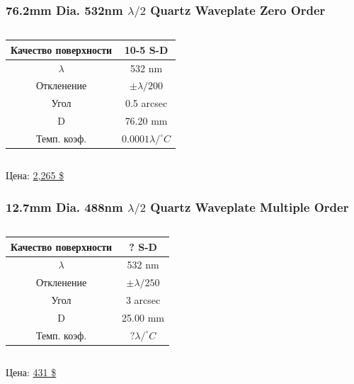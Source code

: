 \documentclass[handout]{beamer}
\begin{document}
\begin{frame}
    \frametitle{ 76.2mm Dia. 532nm $\lambda /2$ Quartz Waveplate Zero Order }
    \begin{columns}
        \begin{column}{0.5\textwidth}
            \begin{tabular}{c||c}
                Качество поверхности & 10-5 S-D \\ \hline
                $\lambda$ & 532 nm \\ \hline
                Откленение & $\pm \lambda /200$ \\ \hline
                Угол & 0.5 arcsec \\ \hline
                D & 76.20  mm \\ \hline
                Темп. коэф. &  $0.0001 \lambda / ^\circ C$
            \end{tabular}
        \end{column}
    \end{columns}

    Цена: \href{https://www.edmundoptics.com/p/762mm-dia-532nm-lambda2-quartz-waveplate-zero-order/28042/}{2,265 \$}
\end{frame}

\begin{frame}
    \frametitle{  12.7mm Dia. 488nm $\lambda /2$ Quartz Waveplate Multiple Order }
    \begin{columns}
        \begin{column}{0.5\textwidth}
            \begin{tabular}{c||c}
                Качество поверхности & ? S-D \\ \hline
                $\lambda$ & 532 nm \\ \hline
                Откленение & $\pm \lambda /250$ \\ \hline
                Угол & 3 arcsec \\ \hline
                D & 25.00  mm \\ \hline
                Темп. коэф. &  $ ? \lambda / ^\circ C$
            \end{tabular}
        \end{column}
    \end{columns}

    Цена: \href{https://www.edmundoptics.com/p/532nm-lambda2-polymer-waveplate/32495/}{431 \$}
\end{frame}
\end{document}
